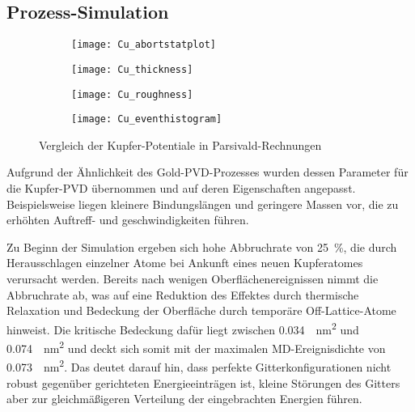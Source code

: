 \subsection{Prozess-Simulation}
\label{coppersimulation}

\begin{figure}[hp]
  \captionsetup[subfigure]{singlelinecheck=false}
  \def\subfigwidth{0.49\textwidth}
  \begin{subfigure}[t]{\subfigwidth}
    \texttt{[image: Cu\_abortstatplot]}
    \label{fig:copperparsivald-a}
  \end{subfigure}
  \hfill
  \begin{subfigure}[t]{\subfigwidth}
    \texttt{[image: Cu\_thickness]}
    \label{fig:copperparsivald-b}
  \end{subfigure}
  \begin{subfigure}[t]{\subfigwidth}
    \texttt{[image: Cu\_roughness]}
    \label{fig:copperparsivald-c}
  \end{subfigure}
  \hfill
  \begin{subfigure}[t]{\subfigwidth}
    \texttt{[image: Cu\_eventhistogram]}
    \label{fig:copperparsivald-d}
  \end{subfigure}
  \caption{Vergleich der Kupfer-Potentiale in Parsivald-Rechnungen}
  \label{fig:copperparsivald}
\end{figure}

Aufgrund der Ähnlichkeit des Gold-PVD-Prozesses wurden dessen Parameter für die Kupfer-PVD übernommen und auf deren Eigenschaften angepasst.
Beispielsweise liegen kleinere Bindungslängen und geringere Massen vor, die zu erhöhten Auftreff- und geschwindigkeiten führen.

Zu Beginn der Simulation ergeben sich hohe Abbruchrate von \SI{25}{\percent}, die durch Herausschlagen einzelner Atome bei Ankunft eines neuen Kupferatomes verursacht werden.
Bereits nach wenigen Oberflächenereignissen nimmt die Abbruchrate ab, was auf eine Reduktion des Effektes durch thermische Relaxation und Bedeckung der Oberfläche durch temporäre Off-Lattice-Atome hinweist.
Die kritische Bedeckung dafür liegt zwischen \SI{0.034}{\per\nano\meter\squared} und \SI{0.074}{\per\nano\meter\squared} und deckt sich somit mit der maximalen MD-Ereignisdichte von \SI{0.073}{\per\nano\meter\squared}.
Das deutet darauf hin, dass perfekte Gitterkonfigurationen nicht robust gegenüber gerichteten Energieeinträgen ist, kleine Störungen des Gitters aber zur gleichmäßigeren Verteilung der eingebrachten Energien führen.

